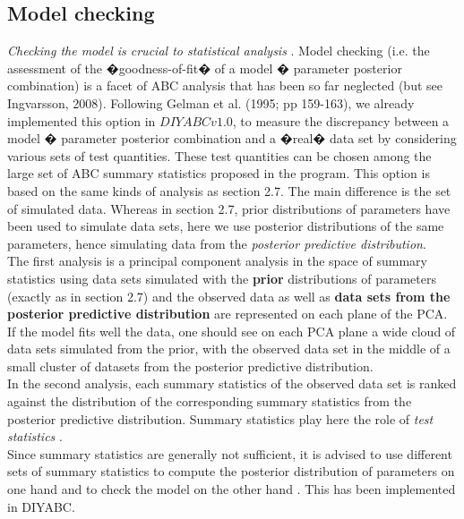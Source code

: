 \subsection{Model checking}
\emph{Checking the model is crucial to statistical analysis}  \citep[p161 in][]{GCSR1995}. Model checking (i.e. the assessment of the �goodness-of-fit� of a model � parameter posterior combination) is a facet of ABC analysis that has been so far neglected (but see Ingvarsson,  2008). Following Gelman et al. (1995; pp 159-163), we already implemented this option in $DIYABCv1.0$,  to measure the discrepancy between a model � parameter posterior combination and a �real� data set by considering various sets of test quantities. These test quantities can be chosen among the large set of ABC summary statistics proposed in the program. This option is based on the same kinds of analysis as section 2.7. The main difference is the set of simulated data. Whereas in section 2.7, prior distributions of parameters have been used to simulate data sets, here we use posterior distributions of the same parameters, hence simulating data from the \emph{posterior predictive distribution}. \\
The first analysis is a principal component analysis in the space of summary statistics using data sets simulated with the \textbf{prior} distributions of parameters (exactly as in section 2.7) and the observed data as well as \textbf{data sets from the posterior predictive distribution} are represented on each plane of the PCA. If the model fits well the data, one should see on each PCA plane a wide cloud of data sets simulated from the prior, with the observed data set in the middle of a small cluster of datasets from the posterior predictive distribution.\\
In the second analysis, each summary statistics of the observed data set is ranked against the distribution of the corresponding summary statistics from the posterior predictive distribution. Summary statistics play here the role of \emph{test statistics} \citep[p169 in][]{GCSR1995}.\\
 Since summary statistics are generally not sufficient, it is advised to use different sets of summary statistics to compute the posterior distribution of parameters on one hand and to check the model on the other hand \citep[see][]{C2010}. This has been implemented in DIYABC. 

